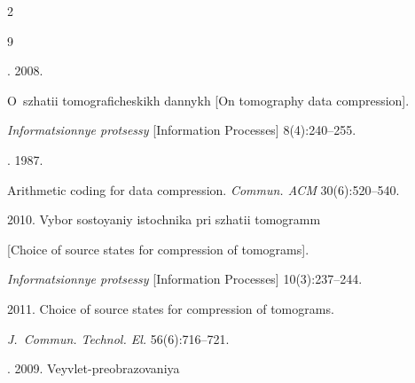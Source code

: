 












  \begin{multicols}{2}



\renewcommand{\bibname}{\protect\rmfamily References}




{\small\frenchspacing

 {%


 \begin{thebibliography}{9}


. 2008. 

O~szhatii tomograficheskikh dannykh [On tomography data compression]. 

\textit{Informatsionnye protsessy} [Information Processes] 8(4):240--255.


. 1987. 

Arithmetic coding for data compression. \textit{Commun. ACM} 30(6):520--540.


 2010. Vybor sostoyaniy istochnika pri szhatii tomogramm 

[Choice of source states for compression of tomograms]. 

\textit{Informatsionnye protsessy} [Information Processes] 10(3):237--244.


 2011. Choice of source states for compression of tomograms. 

\textit{J.~Commun. Technol. El.} 56(6):716--721.


. 2009. Veyvlet-preobrazovaniya 


\end{thebibliography}}}
\end{multicols}
